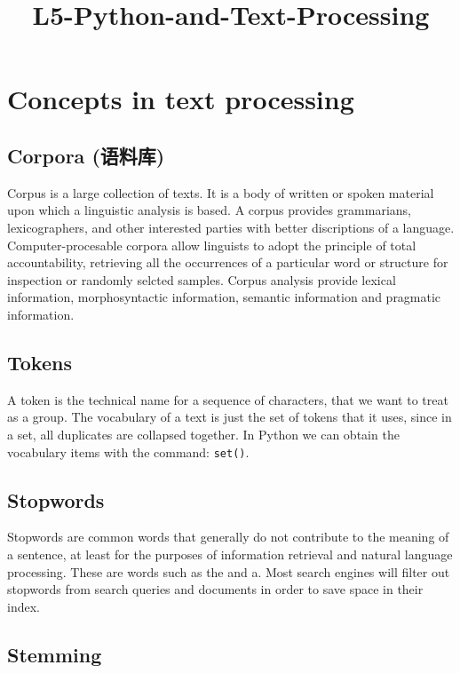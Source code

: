 \documentclass{article}
\title{L5-Python-and-Text-Processing}
\begin{document}
    \maketitle




    \section{Concepts in text processing}\label{concepts-in-text-processing}

\subsection{Corpora (语料库)}\label{corpora-ux8bedux6599ux5e93}

Corpus is a large collection of texts. It is a body of written or spoken
material upon which a linguistic analysis is based. A corpus provides
grammarians, lexicographers, and other interested parties with better
discriptions of a language. Computer-procesable corpora allow linguists
to adopt the principle of total accountability, retrieving all the
occurrences of a particular word or structure for inspection or randomly
selcted samples. Corpus analysis provide lexical information,
morphosyntactic information, semantic information and pragmatic
information.

\subsection{Tokens}\label{tokens}

A token is the technical name for a sequence of characters, that we want
to treat as a group. The vocabulary of a text is just the set of tokens
that it uses, since in a set, all duplicates are collapsed together. In
Python we can obtain the vocabulary items with the command:
\texttt{set()}.

\subsection{Stopwords}\label{stopwords}

Stopwords are common words that generally do not contribute to the
meaning of a sentence, at least for the purposes of information
retrieval and natural language processing. These are words such as the
and a. Most search engines will filter out stopwords from search queries
and documents in order to save space in their index.

\subsection{Stemming}\label{stemming}
\end{document}
